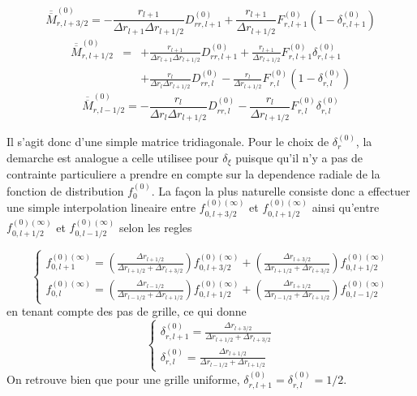 \[
\overline{\overline{M}}_{r,l+3/2}^{\left(0\right)}=-\frac{r_{l+1}}{\Delta r_{l+1}\Delta r_{l+1/2}}D_{rr,l+1}^{\left(0\right)}+\frac{r_{l+1}}{\Delta r_{l+1/2}}F_{r,l+1}^{\left(0\right)}\left(1-\delta_{r,l+1}^{\left(0\right)}\right)\]
\begin{eqnarray*}
\overline{\overline{M}}_{r,l+1/2}^{\left(0\right)} & = & +\frac{r_{l+1}}{\Delta r_{l+1}\Delta r_{l+1/2}}D_{rr,l+1}^{\left(0\right)}+\frac{r_{l+1}}{\Delta r_{l+1/2}}F_{r,l+1}^{\left(0\right)}\delta_{r,l+1}^{\left(0\right)}\\
 &  & +\frac{r_{l}}{\Delta r_{l}\Delta r_{l+1/2}}D_{rr,l}^{\left(0\right)}-\frac{r_{l}}{\Delta r_{l+1/2}}F_{r,l}^{\left(0\right)}\left(1-\delta_{r,l}^{\left(0\right)}\right)\end{eqnarray*}
 \[
\overline{\overline{M}}_{r,l-1/2}^{\left(0\right)}=-\frac{r_{l}}{\Delta r_{l}\Delta r_{l+1/2}}D_{rr,l}^{\left(0\right)}-\frac{r_{l}}{\Delta r_{l+1/2}}F_{r,l}^{\left(0\right)}\delta_{r,l}^{\left(0\right)}\]


Il s'agit donc d'une simple matrice tridiagonale. Pour le choix de
$\delta_{r}^{\left(0\right)}$, la demarche est analogue a celle utilisee
pour $\delta_{\xi}$ puisque qu'il n'y a pas de contrainte particuliere
a prendre en compte sur la dependence radiale de la fonction de distribution
$f_{0}^{\left(0\right)}$. La fa\c{c}on la plus naturelle consiste
donc a effectuer une simple interpolation lineaire entre $f_{0,l+3/2}^{\left(0\right)(\infty)}$
et $f_{0,l+1/2}^{\left(0\right)(\infty)}$ ainsi qu'entre $f_{0,l+1/2}^{\left(0\right)(\infty)}$
et $f_{0,l-1/2}^{\left(0\right)(\infty)}$ selon les regles

\[
\left\{ \begin{array}{l}
f_{0,l+1}^{\left(0\right)(\infty)}=\left(\frac{\Delta r_{l+1/2}}{\Delta r_{l+1/2}+\Delta r_{l+3/2}}\right)f_{0,l+3/2}^{\left(0\right)(\infty)}+\left(\frac{\Delta r_{l+3/2}}{\Delta r_{l+1/2}+\Delta r_{l+3/2}}\right)f_{0,l+1/2}^{\left(0\right)(\infty)}\\
f_{0,l}^{\left(0\right)(\infty)}=\left(\frac{\Delta r_{l-1/2}}{\Delta r_{l-1/2}+\Delta r_{l+1/2}}\right)f_{0,l+1/2}^{\left(0\right)(\infty)}+\left(\frac{\Delta r_{l+1/2}}{\Delta r_{l-1/2}+\Delta r_{l+1/2}}\right)f_{0,l-1/2}^{\left(0\right)(\infty)}\end{array}\right.\]
 en tenant compte des pas de grille, ce qui donne \[
\left\{ \begin{array}{l}
\delta_{r,l+1}^{\left(0\right)}=\frac{\Delta r_{l+3/2}}{\Delta r_{l+1/2}+\Delta r_{l+3/2}}\\
\delta_{r,l}^{\left(0\right)}=\frac{\Delta r_{l+1/2}}{\Delta r_{l-1/2}+\Delta r_{l+1/2}}\end{array}\right.\]
 On retrouve bien que pour une grille uniforme, $\delta_{r,l+1}^{\left(0\right)}=\delta_{r,l}^{\left(0\right)}=1/2.$

